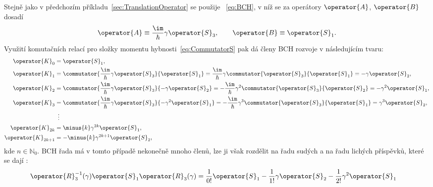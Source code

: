 \begin{solution}
	Stejně jako v předchozím příkladu~\ref{sec:TranslationOperator} se použije ~\eqref{eq:BCH}, v níž se za operátory $\operator{A}$, $\operator{B}$ dosadí
	\begin{equation}
        \operator{A}
            \equiv\frac{\im}{\hbar}\gamma\operator{S}_{3},\qquad
        \operator{B}
            \equiv\operator{S}_{1}.
	\end{equation}
    Využití komutačních relací pro složky momentu hybnosti~\eqref{eq:CommutatorS} pak dá členy BCH rozvoje v následujícím tvaru:
    \begin{subequations}
        \begin{align}
            \operator{K}_{0}
                &=\operator{S}_{1},\\
            \operator{K}_{1}
                &=\commutator{\frac{\im}{\hbar}\gamma\operator{S}_{3}}{\operator{S}_{1}}
                =\frac{\im}{\hbar}\gamma\commutator{\operator{S}_{3}}{\operator{S}_{1}}
                =-\gamma\operator{S}_{2},\\
            \operator{K}_{2}
                &=\commutator{\frac{\im}{\hbar}\gamma\operator{S}_{3}}{-\gamma\operator{S}_{2}}
                =-\frac{\im}{\hbar}\gamma^{2}\commutator{\operator{S}_{3}}{\operator{S}_{2}}
                =-\gamma^{2}\operator{S}_{1},\\
            \operator{K}_{3}
                &=\commutator{\frac{\im}{\hbar}\gamma\operator{S}_{3}}{-\gamma^{2}\operator{S}_{1}}
                =-\frac{\im}{\hbar}\gamma^{3}\commutator{\operator{S}_{3}}{\operator{S}_{1}}
                =\gamma^{3}\operator{S}_{2},\\
                &\ \,\vdots\nonumber\\
            \operator{K}_{2k}
                &=\minus{k}\gamma^{2k}\operator{S}_{1},\\
            \operator{K}_{2k+1}
                &=-\minus{k}\gamma^{2k+1}\operator{S}_{2},
        \end{align}
    \end{subequations}
    kde $n\in\mathbb{N}_{0}$.
	BCH řada má v tomto případě nekonečně mnoho členů, lze ji však rozdělit na řadu sudých a na řadu lichých příspěvků, které se dají :
	\begin{align}
		\operator{R}^{-1}_{3}(\gamma)\operator{S}_{1}\operator{R}_{3}(\gamma)
			&=\frac{1}{0!}\operator{S}_{1}-\frac{1}{1!}\gamma\operator{S}_{2}-\frac{1}{2!}\gamma^{2}\operator{S}_{1}

\end{align}
\end{solution}
